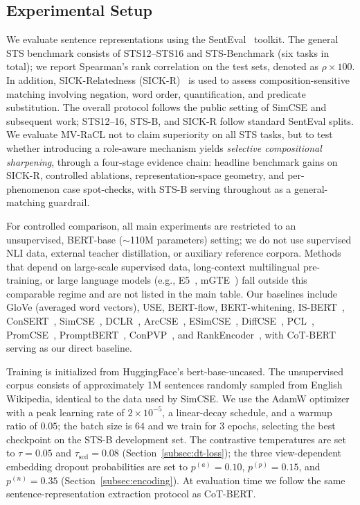 \documentclass[lettersize,journal]{IEEEtran}
\begin{document}
\subsection{Experimental Setup}
\label{subsec:setup-exp}

We evaluate sentence representations using the SentEval~\cite{senteval} toolkit. The general STS benchmark consists of STS12--STS16 and STS-Benchmark (six tasks in total); we report Spearman's rank correlation on the test sets, denoted as $\rho \times 100$. In addition, SICK-Relatedness (SICK-R)~\cite{sick} is used to assess composition-sensitive matching involving negation, word order, quantification, and predicate substitution. The overall protocol follows the public setting of SimCSE and subsequent work; STS12--16, STS-B, and SICK-R follow standard SentEval splits. We evaluate MV-RaCL not to claim superiority on all STS tasks, but to test whether introducing a role-aware mechanism yields \emph{selective compositional sharpening}, through a four-stage evidence chain: headline benchmark gains on SICK-R, controlled ablations, representation-space geometry, and per-phenomenon case spot-checks, with STS-B serving throughout as a general-matching guardrail.

For controlled comparison, all main experiments are restricted to an unsupervised, BERT-base ($\sim$110M parameters) setting; we do not use supervised NLI data, external teacher distillation, or auxiliary reference corpora. Methods that depend on large-scale supervised data, long-context multilingual pre-training, or large language models (e.g., E5~\cite{e5}, mGTE~\cite{gte}) fall outside this comparable regime and are not listed in the main table. Our baselines include GloVe (averaged word vectors), USE, BERT-flow, BERT-whitening, IS-BERT~\cite{isbert}, ConSERT~\cite{consert}, SimCSE~\cite{simcse}, DCLR~\cite{dclr}, ArcCSE~\cite{arccse}, ESimCSE~\cite{esimcse}, DiffCSE~\cite{diffcse}, PCL~\cite{pcl}, PromCSE~\cite{promcse}, PromptBERT~\cite{promptbert}, ConPVP~\cite{conpvp}, and RankEncoder~\cite{rankencoder}, with CoT-BERT~\cite{cotbert} serving as our direct baseline.

Training is initialized from HuggingFace's bert-base-uncased. The unsupervised corpus consists of approximately 1M sentences randomly sampled from English Wikipedia, identical to the data used by SimCSE. We use the AdamW optimizer with a peak learning rate of $2\times 10^{-5}$, a linear-decay schedule, and a warmup ratio of $0.05$; the batch size is $64$ and we train for $3$ epochs, selecting the best checkpoint on the STS-B development set. The contrastive temperatures are set to $\tau = 0.05$ and $\tau_{\mathrm{scd}} = 0.08$ (Section~\ref{subsec:dt-loss}); the three view-dependent embedding dropout probabilities are set to $p^{(a)} = 0.10$, $p^{(p)} = 0.15$, and $p^{(n)} = 0.35$ (Section~\ref{subsec:encoding}). At evaluation time we follow the same sentence-representation extraction protocol as CoT-BERT.
\end{document}
